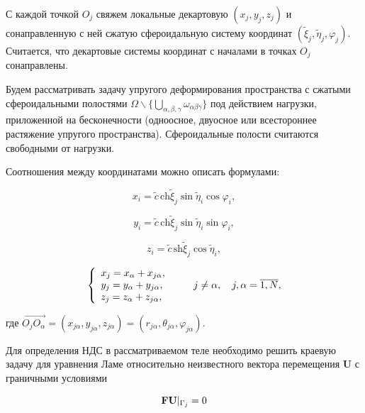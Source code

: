 С каждой точкой $O_j$ свяжем локальные декартовую $(x_j,y_j,z_j)$ и сонаправленную с ней сжатую сфероидальную систему координат $(\tilde\xi_j,\tilde\eta_j,\varphi_j)$. Считается, что декартовые системы координат с началами в точках $O_j$ сонаправлены.

Будем рассматривать задачу упругого деформирования пространства с сжатыми сфероидальными полостями $\Omega\backslash\bigg\{\bigcup\limits_{\alpha,\beta,\gamma}\omega_{\alpha\beta\gamma}\bigg\}$ под действием нагрузки, приложенной на бесконечности (одноосное, двуосное или всестороннее растяжение упругого пространства). Сфероидальные полости считаются свободными от нагрузки.

Соотношения между координатами можно описать формулами:

\begin{equation*}
{x_i} = \tilde c\,\mathrm{ch}\tilde\xi_j\sin {\tilde\eta _i}\cos {\varphi _i},
\end{equation*}

\begin{equation}
{y_i} = \tilde c\,\mathrm{ch}\tilde\xi_j\sin {\tilde\eta _i}\sin {\varphi _i},
\label{eq:11:22k}
\end{equation}

\begin{equation*}
{z_i} = \tilde c\,\mathrm{sh}\tilde\xi_j\cos {\tilde\eta _i},
\end{equation*}

\begin{equation}
\left\{ {\begin{array}{*{20}{l}}
{{x_j} = {x_\alpha } + {x_{j\alpha }},}\\
{{y_j} = {y_\alpha } + {y_{j\alpha }},}\\
{{z_j} = {z_\alpha } + {z_{j\alpha }},}
\end{array}} \right.\qquad {\kern 1pt} j \ne \alpha ,\quad j,\alpha  = \overline {1,N},
\label{eq:11:23k}
\end{equation}

\noindent где $\overrightarrow {{O_j}{O_\alpha }}  = \left( {{x_{j\alpha }},{y_{j\alpha }},{z_{j\alpha }}} \right) = \left( {{r_{j\alpha }},{\theta _{j\alpha }},{\varphi _{j\alpha }}} \right)$.

Для определения НДС в рассматриваемом теле необходимо решить краевую задачу для уравнения Ламе относительно неизвестного вектора перемещения   $\mathbf{U}$ с граничными условиями

\begin{equation}
{\bf{FU}}{|_{{\Gamma _j}}} = 0
\end{equation}

